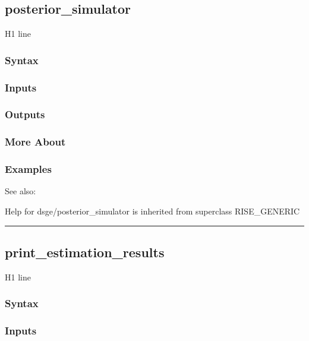 \documentclass[letterpaper,10pt,english]{sphinxmanual}
\begin{document}
\subsection{posterior\_simulator}
\label{classes/models/@dsge/dsge:posterior-simulator}\label{classes/models/@dsge/dsge:id116}
H1 line


\subsubsection{Syntax}
\label{classes/models/@dsge/dsge:id117}

\subsubsection{Inputs}
\label{classes/models/@dsge/dsge:id118}

\subsubsection{Outputs}
\label{classes/models/@dsge/dsge:id119}

\subsubsection{More About}
\label{classes/models/@dsge/dsge:id120}

\subsubsection{Examples}
\label{classes/models/@dsge/dsge:id121}
See also:

Help for dsge/posterior\_simulator is inherited from superclass RISE\_GENERIC


\bigskip\hrule{}\bigskip



\subsection{print\_estimation\_results}
\label{classes/models/@dsge/dsge:print-estimation-results}\label{classes/models/@dsge/dsge:id122}
H1 line


\subsubsection{Syntax}
\label{classes/models/@dsge/dsge:id123}

\subsubsection{Inputs}
\label{classes/models/@dsge/dsge:id124}
\end{document}

